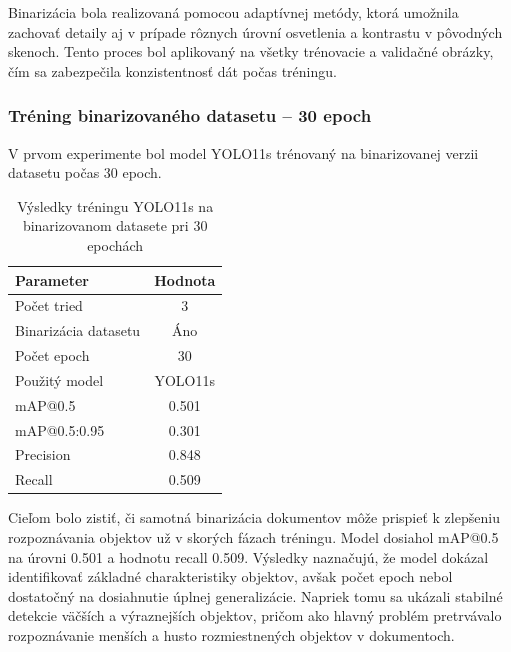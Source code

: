             Binarizácia bola realizovaná pomocou adaptívnej metódy, ktorá umožnila zachovať detaily aj v prípade rôznych úrovní osvetlenia a kontrastu v pôvodných skenoch. Tento proces bol aplikovaný na všetky trénovacie a validačné obrázky, čím sa zabezpečila konzistentnosť dát počas tréningu.

            \subsubsection{Tréning binarizovaného datasetu – 30 epoch}

            V prvom experimente bol model YOLO11s trénovaný na binarizovanej verzii datasetu počas 30 epoch.

            \begin{table}[H]
                \centering
                \begin{tabular}{|l|c|}
                \hline
                \textbf{Parameter} & \textbf{Hodnota} \\ \hline
                Počet tried & 3 \\ \hline
                Binarizácia datasetu & Áno \\ \hline
                Počet epoch & 30 \\ \hline
                Použitý model & YOLO11s \\ \hline
                mAP@0.5 & 0.501 \\ \hline
                mAP@0.5:0.95 & 0.301 \\ \hline
                Precision & 0.848 \\ \hline
                Recall & 0.509 \\ \hline
                \end{tabular}
                \caption{Výsledky tréningu YOLO11s na binarizovanom datasete pri 30 epochách}
                \label{tab:yolo11s_binary_30}
            \end{table}

            Cieľom bolo zistiť, či samotná binarizácia dokumentov môže prispieť k zlepšeniu rozpoznávania objektov už v skorých fázach tréningu. Model dosiahol mAP@0.5 na úrovni 0.501 a hodnotu recall 0.509. Výsledky naznačujú, že model dokázal identifikovať základné charakteristiky objektov, avšak počet epoch nebol dostatočný na dosiahnutie úplnej generalizácie. Napriek tomu sa ukázali stabilné detekcie väčších a výraznejších objektov, pričom ako hlavný problém pretrvávalo rozpoznávanie menších a husto rozmiestnených objektov v dokumentoch.

